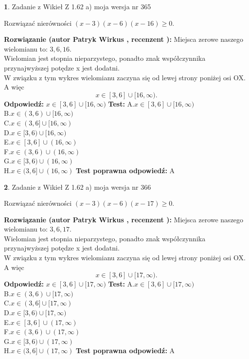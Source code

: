 \documentclass[12pt, a4paper]{article}
\theoremstyle{definition} %
\newtheorem{zad}{}
\newcommand{\zadStart}[1]{\begin{zad}#1\newline}
\newcommand{\zadStop}{\end{zad}}
\newcommand{\rozwStart}[2]{\noindent \textbf{Rozwiązanie (autor #1 , recenzent #2): }\newline}
\newcommand{\rozwStop}{\newline}
\newcommand{\odpStart}{\noindent \textbf{Odpowiedź:}\newline}
\newcommand{\odpStop}{\newline}
\newcommand{\testStart}{\noindent \textbf{Test:}\newline}
\newcommand{\testStop}{\newline}
\newcommand{\kluczStart}{\noindent \textbf{Test poprawna odpowiedź:}\newline}
\newcommand{\kluczStop}{\newline}
\begin{document}
\zadStart{Zadanie z Wikieł Z 1.62 a) moja wersja nr 365}

Rozwiązać nierówności $(x-3)(x-6)(x-16)\ge0$.
\zadStop
\rozwStart{Patryk Wirkus}{}
Miejsca zerowe naszego wielomianu to: $3, 6, 16$.\\
Wielomian jest stopnia nieparzystego, ponadto znak współczynnika przy\linebreak najwyższej potędze x jest dodatni.\\ W związku z tym wykres wielomianu zaczyna się od lewej strony poniżej osi OX. A więc $$x \in [3,6] \cup [16,\infty).$$
\rozwStop
\odpStart
$x \in [3,6] \cup [16,\infty)$
\odpStop
\testStart
A.$x \in [3,6] \cup [16,\infty)$\\
B.$x \in (3,6) \cup [16,\infty)$\\
C.$x \in (3,6] \cup [16,\infty)$\\
D.$x \in [3,6) \cup [16,\infty)$\\
E.$x \in [3,6] \cup (16,\infty)$\\
F.$x \in (3,6) \cup (16,\infty)$\\
G.$x \in [3,6) \cup (16,\infty)$\\
H.$x \in (3,6] \cup (16,\infty)$
\testStop
\kluczStart
A
\kluczStop



\zadStart{Zadanie z Wikieł Z 1.62 a) moja wersja nr 366}

Rozwiązać nierówności $(x-3)(x-6)(x-17)\ge0$.
\zadStop
\rozwStart{Patryk Wirkus}{}
Miejsca zerowe naszego wielomianu to: $3, 6, 17$.\\
Wielomian jest stopnia nieparzystego, ponadto znak współczynnika przy\linebreak najwyższej potędze x jest dodatni.\\ W związku z tym wykres wielomianu zaczyna się od lewej strony poniżej osi OX. A więc $$x \in [3,6] \cup [17,\infty).$$
\rozwStop
\odpStart
$x \in [3,6] \cup [17,\infty)$
\odpStop
\testStart
A.$x \in [3,6] \cup [17,\infty)$\\
B.$x \in (3,6) \cup [17,\infty)$\\
C.$x \in (3,6] \cup [17,\infty)$\\
D.$x \in [3,6) \cup [17,\infty)$\\
E.$x \in [3,6] \cup (17,\infty)$\\
F.$x \in (3,6) \cup (17,\infty)$\\
G.$x \in [3,6) \cup (17,\infty)$\\
H.$x \in (3,6] \cup (17,\infty)$
\testStop
\kluczStart
A
\kluczStop
\end{document}
